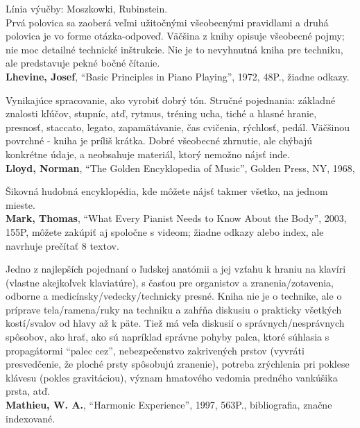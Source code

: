 Línia výučby: Moszkowki, Rubinstein.\\
Prvá polovica sa zaoberá veľmi užitočnými všeobecnými pravidlami a druhá polovica je vo forme otázka-odpoveď. Väčšina z knihy opisuje všeobecné pojmy; nie moc detailné technické inštrukcie. Nie je to nevyhnutná kniha pre techniku, ale predstavuje pekné bočné čítanie.
\medskip\\
\textbf{Lhevine, Josef}, “Basic Principles in Piano Playing”, 1972, 48P., žiadne odkazy. 

Vynikajúce spracovanie, ako vyrobiť dobrý tón. Stručné pojednania: základné znalosti kľúčov, stupníc, atď, rytmus, tréning ucha, tiché a hlasné hranie, presnosť, staccato, legato, zapamätávanie, čas cvičenia, rýchlosť, pedál. Väčšinou povrchné - kniha je príliš krátka. Dobré všeobecné zhrnutie, ale chýbajú konkrétne údaje, a neobsahuje materiál, ktorý nemožno nájsť inde.
\medskip\\
\textbf{Lloyd, Norman}, “The Golden Encyklopedia of Music”, Golden Press, NY, 1968, 

Šikovná hudobná encyklopédia, kde môžete nájsť takmer všetko, na jednom mieste.
\medskip\\
\textbf{Mark, Thomas}, “What Every Pianist Needs to Know About the Body”, 2003, 155P, môžete zakúpiť aj spoločne s videom; žiadne odkazy alebo index, ale navrhuje prečítať 8 textov. 

Jedno z najlepších pojednaní o ľudskej anatómii a jej vzťahu k hraniu na klavíri (vlastne akejkoľvek klaviatúre), s časťou  pre organistov a zranenia/zotavenia, odborne a medicínsky/vedecky/technicky presné. Kniha nie je o technike, ale o príprave tela/ramena/ruky na techniku a zahŕňa diskusiu o prakticky všetkých kostí/svalov od hlavy až k päte. Tiež má veľa diskusií o správnych/nesprávnych spôsobov, ako hrať, ako sú napríklad správne pohyby palca, ktoré súhlasia s propagátormi “palec cez”, nebezpečenstvo zakrivených prstov (vyvráti presvedčenie, že ploché prsty spôsobujú zranenie), potreba zrýchlenia pri poklese klávesu (pokles gravitáciou), význam hmatového vedomia predného vankúšika prsta, atď.
\medskip\\
\textbf{Mathieu, W. A.}, “Harmonic Experience”, 1997, 563P., bibliografia, značne indexované. 


